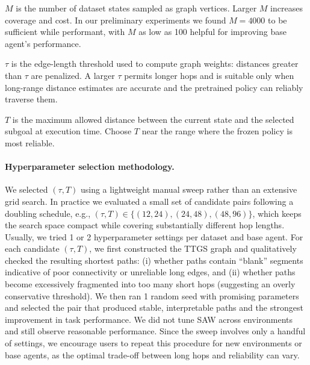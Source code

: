 \documentclass{article} %
\begin{document}
$M$ is the number of dataset states sampled as graph vertices. Larger $M$ increases coverage and cost. In our preliminary experiments we found $M=4000$ to be sufficient while performant, with $M$ as low as 100 helpful for improving base agent's performance.

$\tau$ is the edge-length threshold used to compute graph weights: distances greater than $\tau$ are penalized. A larger $\tau$ permits longer hops and is suitable only when long-range distance estimates are accurate and the pretrained policy can reliably traverse them.

$T$ is the maximum allowed distance between the current state and the selected subgoal at execution time. Choose $T$ near the range where the frozen policy is most reliable.

\paragraph{Hyperparameter selection methodology.}
We selected $(\tau, T)$ using a lightweight manual sweep rather than an extensive grid search.
In practice we evaluated a small set of candidate pairs following a doubling schedule,
e.g., $(\tau, T)\in\{(12,24),(24,48),(48,96)\}$, which keeps the search space compact while covering substantially different hop lengths. Usually, we tried 1 or 2 hyperparameter settings per dataset and base agent.
For each candidate $(\tau, T)$, we first constructed the TTGS graph and qualitatively checked the resulting shortest paths:
(i) whether paths contain ``blank'' segments indicative of poor connectivity or unreliable long edges, and
(ii) whether paths become excessively fragmented into too many short hops (suggesting an overly conservative threshold).
We then ran 1 random seed with promising parameters and selected the pair that produced stable, interpretable paths and the strongest improvement in task performance. We did not tune SAW across environments and still observe reasonable performance.
Since the sweep involves only a handful of settings, we encourage users to repeat this procedure for new environments or base agents, as the optimal trade-off between long hops and reliability can vary.
\end{document}
